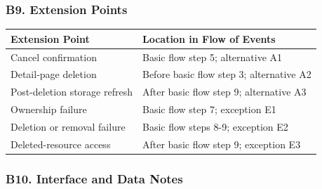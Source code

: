 \documentclass[12pt]{article}
\renewcommand{\baselinestretch}{1.5}
\begin{document}
\hypertarget{sec:b9-extension-points}{}
\subsubsection*{B9. Extension Points}
\par\medskip

\begingroup
\small
\renewcommand{\baselinestretch}{1.0}\selectfont
\renewcommand{\arraystretch}{1.15}
\setlength{\tabcolsep}{6pt}
\begin{longtable}{|>{\raggedright\arraybackslash}p{}|>{\raggedright\arraybackslash}p{}|}
\hline
\textbf{Extension Point} & \textbf{Location in Flow of Events} \\ \hline
\endhead
Cancel confirmation & Basic flow step 5; alternative A1 \\ \hline
Detail-page deletion & Before basic flow step 3; alternative A2 \\ \hline
Post-deletion storage refresh & After basic flow step 9; alternative A3 \\ \hline
Ownership failure & Basic flow step 7; exception E1 \\ \hline
Deletion or removal failure & Basic flow steps 8-9; exception E2 \\ \hline
Deleted-resource access & After basic flow step 9; exception E3 \\ \hline
\end{longtable}
\endgroup
\par\medskip

\hypertarget{sec:b10-interface-and-data-notes}{}
\subsubsection*{B10. Interface and Data Notes}
\par\medskip
\end{document}
